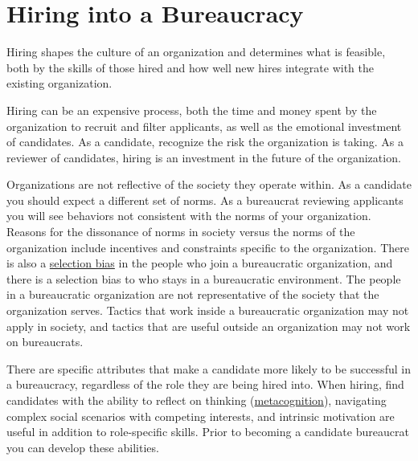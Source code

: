 



\section{Hiring into a Bureaucracy\label{sec:hiring}}


Hiring shapes the culture of an organization and determines what is feasible, both by the skills of those hired and how well new hires integrate with the existing organization. 

Hiring can be an expensive process, both the time and money spent by the organization to recruit and filter applicants, as well as the emotional investment of candidates. %
As a candidate, recognize the risk the organization is taking. 
As a reviewer of candidates, hiring is an investment in the future of the organization. %

Organizations are not reflective of the society they operate within. As a candidate you should expect a different set of norms. As a bureaucrat reviewing applicants you will see behaviors not consistent with the norms of your organization. 
Reasons for the dissonance of norms in society versus the norms of the organization include incentives and constraints specific to the organization. 
There is also a \href{https://en.wikipedia.org/wiki/Selection_bias}{selection bias} in
the people who join a bureaucratic organization, and there is a selection bias to who stays in a bureaucratic environment. 
The people in a bureaucratic organization are not representative of the society that the organization serves. Tactics that work inside a bureaucratic organization may not apply in society, and tactics that are useful outside an organization may not work on bureaucrats. 



There are specific attributes that make a candidate more likely to be successful in a bureaucracy, regardless of the role they are being hired into. When hiring, find candidates with the ability to reflect on thinking (\href{https://en.wikipedia.org/wiki/Metacognition}{metacognition}),
\iftoggle{WPinmargin}{\marginpar{$>$Wikipedia: Metacognition}}{}
navigating complex social scenarios with competing interests, and intrinsic motivation are useful in addition to role-specific skills. Prior to becoming a candidate bureaucrat you can develop these abilities. 





